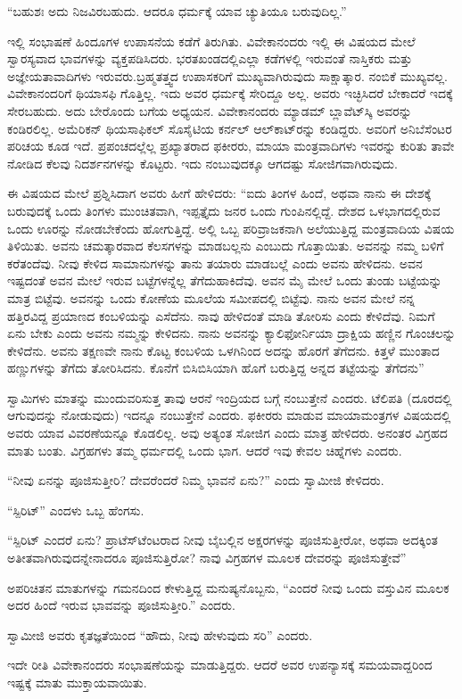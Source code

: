 “ಬಹುಶಃ ಅದು ನಿಜವಿರಬಹುದು. ಆದರೂ ಧರ್ಮಕ್ಕೆ ಯಾವ ಚ್ಯುತಿಯೂ ಬರುವುದಿಲ್ಲ.”

ಇಲ್ಲಿ ಸಂಭಾಷಣೆ ಹಿಂದೂಗಳ ಉಪಾಸನೆಯ ಕಡೆಗೆ ತಿರುಗಿತು. ವಿವೇಕಾನಂದರು ಇಲ್ಲಿ ಈ ವಿಷಯದ ಮೇಲೆ ಸ್ವಾರಸ್ಯವಾದ ಭಾವಗಳನ್ನು ವ್ಯಕ್ತಪಡಿಸಿದರು. ಭರತಖಂಡದಲ್ಲಿ\break ಎಲ್ಲಾ ಕಡೆಗಳಲ್ಲಿ ಇರುವಂತೆ ನಾಸ್ತಿಕರು ಮತ್ತು ಅಜ್ಞೇಯತಾವಾದಿಗಳು ಇರುವರು.\break ಬ್ರಹ್ಮತತ್ತ್ವದ ಉಪಾಸಕರಿಗೆ ಮುಖ್ಯವಾಗಿರುವುದು ಸಾಕ್ಷಾತ್ಕಾರ. ನಂಬಿಕೆ ಮುಖ್ಯವಲ್ಲ. ವಿವೇಕಾನಂದರಿಗೆ ಥಿಯಾಸಫಿ ಗೊತ್ತಿಲ್ಲ. ಇದು ಅವರ ಧರ್ಮಕ್ಕೆ ಸೇರಿದ್ದೂ ಅಲ್ಲ. ಅವರು ಇಚ್ಛಿಸಿದರೆ ಬೇಕಾದರೆ ಇದಕ್ಕೆ ಸೇರಬಹುದು. ಅದು ಬೇರೊಂದು ಬಗೆಯ ಅಧ್ಯಯನ. ವಿವೇಕಾನಂದರು ಮ್ಯಾಡಮ್​ ಬ್ಲಾವೆಟ್​ಸ್ಕಿ ಅವರನ್ನು ಕಂಡಿರಲಿಲ್ಲ. ಅಮೆರಿಕನ್​ ಥಿಯಸಾಫಿಕಲ್​ ಸೊಸೈಟಿಯ ಕರ್ನಲ್​ ಆಲ್​ಕಾಟ್​ರನ್ನು ಕಂಡಿದ್ದರು. ಅವರಿಗೆ ಅನಿಬೆಸೆಂಟರ ಪರಿಚಯ ಕೂಡ ಇದೆ. ಪ್ರಪಂಚದಲ್ಲೆಲ್ಲ ಪ್ರಖ್ಯಾತರಾದ ಫಕೀರರು, ಮಾಯಾ ಮಂತ್ರವಾದಿಗಳು ಇವರನ್ನು ಕುರಿತು ತಾವೇ ನೋಡಿದ ಕೆಲವು ನಿದರ್ಶನಗಳನ್ನು ಕೊಟ್ಟರು. ಇದು ನಂಬುವುದಕ್ಕೂ ಆಗದಷ್ಟು ಸೋಜಿಗವಾಗಿರುವುದು.

ಈ ವಿಷಯದ ಮೇಲೆ ಪ್ರಶ್ನಿಸಿದಾಗ ಅವರು ಹೀಗೆ ಹೇಳಿದರು: “ಐದು ತಿಂಗಳ ಹಿಂದೆ, ಅಥವಾ ನಾನು ಈ ದೇಶಕ್ಕೆ ಬರುವುದಕ್ಕೆ ಒಂದು ತಿಂಗಳು ಮುಂಚಿತವಾಗಿ, ಇಪ್ಪತ್ತೈದು ಜನರ ಒಂದು ಗುಂಪಿನಲ್ಲಿದ್ದೆ. ದೇಶದ ಒಳಭಾಗದಲ್ಲಿರುವ ಒಂದು ಊರನ್ನು ನೋಡಬೇಕೆಂದು ಹೋಗುತ್ತಿದ್ದೆ. ಅಲ್ಲಿ ಒಬ್ಬ ಪರಿವ್ರಾಜಕನಾಗಿ ಅಲೆಯುತ್ತಿದ್ದ ಮಂತ್ರವಾದಿಯ ವಿಷಯ ತಿಳಿಯಿತು. ಅವನು ಚಮತ್ಕಾರವಾದ ಕೆಲಸಗಳನ್ನು ಮಾಡಬಲ್ಲನು ಎಂಬುದು ಗೊತ್ತಾಯಿತು. ಅವನನ್ನು ನಮ್ಮ ಬಳಿಗೆ ಕರೆತಂದೆವು. ನೀವು ಕೇಳಿದ ಸಾಮಾನುಗಳನ್ನು ತಾನು ತಯಾರು ಮಾಡಬಲ್ಲೆ ಎಂದು ಅವನು ಹೇಳಿದನು. ಅವನ ಇಷ್ಟದಂತೆ ಅವನ ಮೇಲೆ ಇರುವ ಬಟ್ಟೆಗಳನ್ನೆಲ್ಲ ತೆಗೆದುಹಾಕಿದೆವು. ಅವನ ಮೈ ಮೇಲೆ ಒಂದು ತುಂಡು ಬಟ್ಟೆಯನ್ನು ಮಾತ್ರ ಬಿಟ್ಟೆವು. ಅವನನ್ನು ಒಂದು ಕೋಣೆಯ ಮೂಲೆಯ ಸಮೀಪದಲ್ಲಿ ಬಿಟ್ಟೆವು. ನಾನು ಅವನ ಮೇಲೆ ನನ್ನ ಹತ್ತಿರವಿದ್ದ ಪ್ರಯಾಣದ ಕಂಬಳಿಯನ್ನು ಎಸೆದೆನು. ನಾವು ಹೇಳಿದಂತೆ ಮಾಡಿ ತೋರಿಸು ಎಂದು ಕೇಳಿದೆವು. ನಿಮಗೆ ಏನು ಬೇಕು ಎಂದು ಅವನು ನಮ್ಮನ್ನು ಕೇಳಿದನು. ನಾನು ಅವನನ್ನು ಕ್ಯಾಲಿಫೋರ್ನಿಯಾ ದ್ರಾಕ್ಷಿಯ ಹಣ್ಣಿನ ಗೊಂಚಲನ್ನು ಕೇಳಿದೆನು. ಅವನು ತಕ್ಷಣವೇ ನಾನು ಕೊಟ್ಟ ಕಂಬಳಿಯ ಒಳಗಿನಿಂದ ಅದನ್ನು ಹೊರಗೆ ತೆಗೆದನು. ಕಿತ್ತಳೆ ಮುಂತಾದ ಹಣ್ಣುಗಳನ್ನು ತೆಗೆದು ತೋರಿಸಿದನು. ಕೊನೆಗೆ ಬಿಸಿಬಿಸಿಯಾಗಿ ಹೊಗೆ ಬರುತ್ತಿದ್ದ ಅನ್ನದ ತಟ್ಟೆಯನ್ನು ತೆಗೆದನು”

ಸ್ವಾಮಿಗಳು ಮಾತನ್ನು ಮುಂದುವರಿಸುತ್ತ ತಾವು ಆರನೆ ಇಂದ್ರಿಯದ ಬಗ್ಗೆ ನಂಬುತ್ತೇನೆ ಎಂದರು. ಟೆಲಿಪತಿ (ದೂರದಲ್ಲಿ ಆಗುವುದನ್ನು ನೋಡುವುದು) ಇದನ್ನೂ ನಂಬುತ್ತೇನೆ ಎಂದರು. ಫಕೀರರು ಮಾಡುವ ಮಾಯಾಮಂತ್ರಗಳ ವಿಷಯದಲ್ಲಿ ಅವರು ಯಾವ ವಿವರಣೆಯನ್ನೂ ಕೊಡಲಿಲ್ಲ. ಅವು ಅತ್ಯಂತ ಸೋಜಿಗ ಎಂದು ಮಾತ್ರ ಹೇಳಿದರು. ಅನಂತರ ವಿಗ್ರಹದ ಮಾತು ಬಂತು. ವಿಗ್ರಹಗಳು ತಮ್ಮ ಧರ್ಮದಲ್ಲಿ ಒಂದು ಭಾಗ. ಆದರೆ ಇವು ಕೇವಲ ಚಿಹ್ನೆಗಳು ಎಂದರು.

“ನೀವು ಏನನ್ನು ಪೂಜಿಸುತ್ತೀರಿ? ದೇವರೆಂದರೆ ನಿಮ್ಮ ಭಾವನೆ ಏನು?” ಎಂದು ಸ್ವಾಮೀಜಿ ಕೇಳಿದರು.

“ಸ್ಪಿರಿಟ್​” ಎಂದಳು ಒಬ್ಬ ಹೆಂಗಸು.

“ಸ್ಪಿರಿಟ್​ ಎಂದರೆ ಏನು? ಪ್ರಾಟೆಸ್​ಟೆಂಟರಾದ ನೀವು ಬೈಬಲ್ಲಿನ ಅಕ್ಷರಗಳನ್ನು ಪೂಜಿಸುತ್ತೀರೋ, ಅಥವಾ ಅದಕ್ಕಿಂತ ಅತೀತವಾಗಿರುವುದನ್ನೇನಾದರೂ ಪೂಜಿಸುತ್ತಿರೋ? ನಾವು ವಿಗ್ರಹಗಳ ಮೂಲಕ ದೇವರನ್ನು ಪೂಜಿಸುತ್ತೇವೆ”

ಅಪರಿಚಿತನ ಮಾತುಗಳನ್ನು ಗಮನದಿಂದ ಕೇಳುತ್ತಿದ್ದ ಮನುಷ್ಯನೊಬ್ಬನು, “ಎಂದರೆ ನೀವು ಒಂದು ವಸ್ತುವಿನ ಮೂಲಕ ಅದರ ಹಿಂದೆ ಇರುವ ಭಾವವನ್ನು ಪೂಜಿಸುತ್ತೀರಿ.” ಎಂದರು.

ಸ್ವಾಮೀಜಿ ಅವರು ಕೃತಜ್ಞತೆಯಿಂದ “ಹೌದು, ನೀವು ಹೇಳುವುದು ಸರಿ” ಎಂದರು.

ಇದೇ ರೀತಿ ವಿವೇಕಾನಂದರು ಸಂಭಾಷಣೆಯನ್ನು ಮಾಡುತ್ತಿದ್ದರು. ಆದರೆ ಅವರ ಉಪನ್ಯಾಸಕ್ಕೆ ಸಮಯವಾದ್ದರಿಂದ ಇಷ್ಟಕ್ಕೆ ಮಾತು ಮುಕ್ತಾಯವಾಯಿತು.

